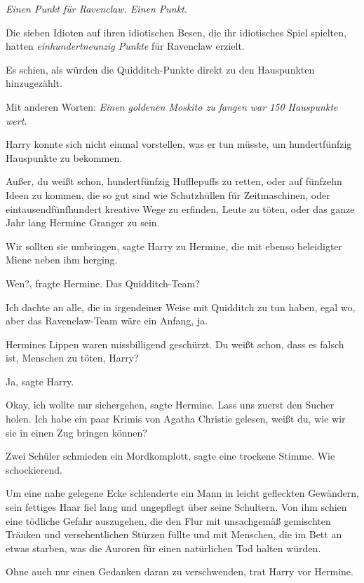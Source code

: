 \emph{Einen Punkt für Ravenclaw. Einen Punkt.}

Die sieben Idioten auf ihren idiotischen Besen, die ihr idiotisches Spiel
spielten, hatten \emph{einhundertneunzig Punkte} für Ravenclaw erzielt.

Es schien, als würden die Quidditch-Punkte direkt zu den Hauspunkten
hinzugezählt.

Mit anderen Worten:\emph{ Einen goldenen Moskito zu fangen war 150 Hauspunkte
wert.}

Harry konnte sich nicht einmal vorstellen, was er tun müsste, um hundertfünfzig
Hauspunkte zu bekommen.

Außer, du weißt schon, hundertfünfzig Hufflepuffs zu retten, oder auf fünfzehn
Ideen zu kommen, die so gut sind wie Schutzhüllen für Zeitmaschinen, oder
eintausendfünfhundert kreative Wege zu erfinden, Leute zu töten, oder das ganze
Jahr lang Hermine Granger zu sein.

\glqq{}Wir sollten sie umbringen\grqq{}, sagte Harry zu Hermine, die mit ebenso
beleidigter Miene neben ihm herging.

\glqq{}Wen?\grqq{}, fragte Hermine. \glqq{}Das Quidditch-Team?\grqq{}

\glqq{}Ich dachte an alle, die in irgendeiner Weise mit Quidditch zu tun haben,
egal wo, aber das Ravenclaw-Team wäre ein Anfang, ja.\grqq{}

Hermines Lippen waren missbilligend geschürzt. \glqq{}Du weißt schon, dass es
falsch ist, Menschen zu töten, Harry?\grqq{}

\glqq{}Ja\grqq{}, sagte Harry.

\glqq{}Okay, ich wollte nur sichergehen\grqq{}, sagte Hermine. \glqq{}Lass uns
zuerst den Sucher holen. Ich habe ein paar Krimis von Agatha Christie gelesen,
weißt du, wie wir sie in einen Zug bringen können?\grqq{}

\glqq{}Zwei Schüler schmieden ein Mordkomplott\grqq{}, sagte eine trockene
Stimme. \glqq{}Wie schockierend.\grqq{}

Um eine nahe gelegene Ecke schlenderte ein Mann in leicht gefleckten Gewändern,
sein fettiges Haar fiel lang und ungepflegt über seine Schultern. Von ihm schien
eine tödliche Gefahr auszugehen, die den Flur mit unsachgemäß gemischten Tränken
und versehentlichen Stürzen füllte und mit Menschen, die im Bett an etwas
starben, was die Auroren für einen natürlichen Tod halten würden.

Ohne auch nur einen Gedanken daran zu verschwenden, trat Harry vor Hermine.

